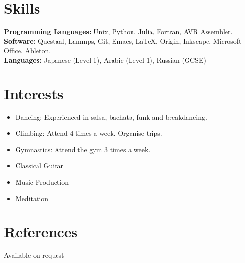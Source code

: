 \documentclass[margin]{res}
\begin{document}
\begin{resume}
\begin{itemize}
 \end{itemize}

\singlespacing
\section{Skills}
   {\bf Programming Languages:} 
 Unix, Python, Julia, Fortran, AVR Assembler.\\
     {\bf Software:} 
 Questaal, Lammps, Git, Emacs, \LaTeX, Origin, Inkscape, Microsoft Office, Ableton.\\
{\bf Languages:}
 Japanese (Level 1), Arabic (Level 1), Russian (GCSE)
\singlespacing

\section{Interests}
\begin{itemize}\itemsep -2pt
\item Dancing: Experienced in salsa, bachata, funk and breakdancing.
\item Climbing: Attend 4 times a week. Organise trips.
\item Gymnastics: Attend the gym 3 times a week.
\item Classical Guitar
\item Music Production
\item Meditation
\end{itemize}
\section{References}
Available on request

\end{resume} 
\end{document}
